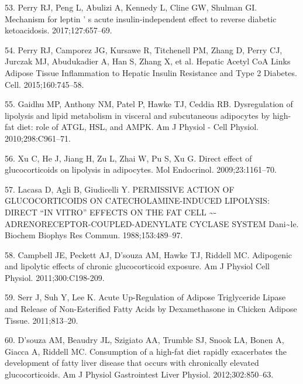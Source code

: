 \documentclass[11pt]{article} %
\begin{document}
53. Perry RJ, Peng L, Abulizi A, Kennedy L, Cline GW, Shulman GI.
Mechanism for leptin ' s acute insulin-independent effect to reverse
diabetic ketoacidosis. 2017;127:657--69.

54. Perry RJ, Camporez JG, Kursawe R, Titchenell PM, Zhang D, Perry CJ,
Jurczak MJ, Abudukadier A, Han S, Zhang X, et al. Hepatic Acetyl CoA
Links Adipose Tissue Inflammation to Hepatic Insulin Resistance and Type
2 Diabetes. Cell. 2015;160:745--58.

55. Gaidhu MP, Anthony NM, Patel P, Hawke TJ, Ceddia RB. Dysregulation
of lipolysis and lipid metabolism in visceral and subcutaneous
adipocytes by high-fat diet: role of ATGL, HSL, and AMPK. Am J Physiol -
Cell Physiol. 2010;298:C961--71.

56. Xu C, He J, Jiang H, Zu L, Zhai W, Pu S, Xu G. Direct effect of
glucocorticoids on lipolysis in adipocytes. Mol Endocrinol.
2009;23:1161--70.

57. Lacasa D, Agli B, Giudicelli Y. PERMISSIVE ACTION OF GLUCOCORTICOIDS
ON CATECHOLAMINE-INDUCED LIPOLYSIS: DIRECT ``IN VITRO'' EFFECTS ON THE
FAT CELL \textasciitilde{}-ADRENORECEPTOR-COUPLED-ADENYLATE CYCLASE
SYSTEM Dani\textasciitilde{}le. Biochem Biophys Res Commun.
1988;153:489--97.

58. Campbell JE, Peckett AJ, D'souza AM, Hawke TJ, Riddell MC.
Adipogenic and lipolytic effects of chronic glucocorticoid exposure. Am
J Physiol Cell Physiol. 2011;300:C198-209.

59. Serr J, Suh Y, Lee K. Acute Up-Regulation of Adipose Triglyceride
Lipase and Release of Non-Esterified Fatty Acids by Dexamethasone in
Chicken Adipose Tissue. 2011;813--20.

60. D'souza AM, Beaudry JL, Szigiato AA, Trumble SJ, Snook LA, Bonen A,
Giacca A, Riddell MC. Consumption of a high-fat diet rapidly exacerbates
the development of fatty liver disease that occurs with chronically
elevated glucocorticoids. Am J Physiol Gastrointest Liver Physiol.
2012;302:850--63.
\end{document}
